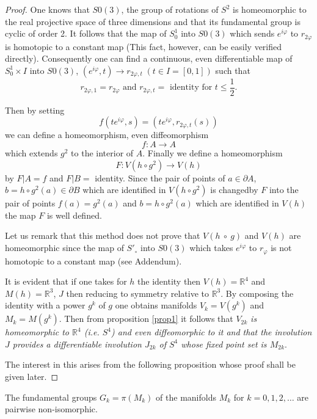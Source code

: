 \begin{proof}
One knows that $S0 (3)$, the group of rotations of $S^2$ is
homeomorphic to the real projective space of three dimensions and that
its fundamental group is cyclic of order 2. It follows that the map
of $S^1_0$ into $S0(3)$ which sends $e^{i \varphi}$ to $r_{2 \varphi}$
is homotopic to a constant map (This fact, however, can be easily
verified directly). Consequently one can find a continuous, even
differentiable map of $S^1_0 \times I$ into $S0 (3)$, $(e^{i \varphi},
t) \to r_{2 \varphi, t} \; (t \in I = [0,1])$ such that 
$$ 
r_{2 \varphi, 1} = r_{2 \varphi} \text{ and } r_{2 \varphi, t} =
\text{ identity for } t \leq \frac{1}{2}.  
$$ 

Then by setting
$$
f(te^{i \varphi}, s) = (te^{i \varphi}, r_{2 \varphi, t}(s)) 
$$
we can define a homeomorphism, even diffeomorphism 
$$
f : A \to A
$$
which extends $g^2$ to the interior of $A$. Finally we define a
homeomorphism 
$$
F : V(h\circ g^2) \to V(h) 
$$
by $F | A = f$ and $F|B =$ identity. Since the pair of points of $a
\in \partial A$, $b = h\circ g^2 (a) \in \partial B$ which are
identified in $V(h\circ g^2)$ is changed\pageoriginale by $F$ into the
pair of points 
$f(a) = g^2 (a)$ and $b = h\circ g^2 (a)$ which are identified in $V(h)$
the map $F$ is well defined. 

Let us remark that this method does not prove that $V(h ~ \circ~ g)$ and
$V(h)$ are homeomorphic since the map of $S'_\circ$ into $S0(3)$ which
takes $e^{i \varphi}$ to $r_{\varphi}$ is not homotopic to a constant
map (see Addendum). 

It is evident that if one takes for $h$ the identity then $V(h) =
\mathbb{R}^{4}$ and $M(h) = \mathbb{R}^{3}$, $J$ then reducing to
symmetry relative to $\mathbb{R}^{3}$. By composing the identity with
a power $g^k$ of $g$  one obtains manifolds $V_k = V(g^k)$ and $M_k =
M(g^k)$. Then from proposition \ref{prop1} it follows that $V_{2k}$ \textit{is
  homeomorphic to $\mathbb{R}^{4}$ (i.e. $S^4$) and even diffeomorphic
  to it and that the involution $J$ provides a differentiable
  involution $J_{2k}$ of $S^4$ whose fixed point set is $M_{2k}$}. 

The interest in this arises from the following proposition whose proof
shall be given later. 
\end{proof}

\begin{proposition}\label{prop2}%
The fundamental groups $G_k = \pi (M_k)$ of the manifolds $M_k$ for $k
= 0, 1, 2, \ldots$ are pairwise non-isomorphic. 
\end{proposition}

